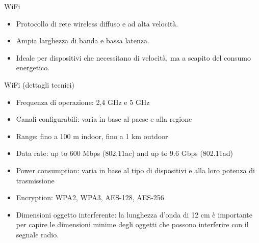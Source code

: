 \documentclass{beamer}
\begin{document}
	\begin{frame}{WiFi}
		\begin{itemize}
			\item Protocollo di rete wireless diffuso e ad alta velocità.
			\item Ampia larghezza di banda e bassa latenza.
			\item Ideale per dispositivi che necessitano di velocità, ma a scapito del consumo energetico.
		\end{itemize}
	\end{frame}
	\begin{frame}{WiFi (dettagli tecnici)}
		\begin{itemize}
			\item Frequenza di operazione: 2,4 GHz e 5 GHz
			\item Canali configurabili: varia in base al paese e alla regione
			\item Range: fino a 100 m indoor, fino a 1 km outdoor
			\item Data rate: up to 600 Mbps (802.11ac) and up to 9.6 Gbps (802.11ad)
			\item Power consumption: varia in base al tipo di dispositivi e alla loro potenza di trasmissione
			\item Encryption: WPA2, WPA3, AES-128, AES-256
			\item Dimensioni oggetto interferente: la lunghezza d'onda di 12 cm è importante per capire le dimensioni minime degli oggetti che possono interferire con il segnale radio.
		\end{itemize}
	\end{frame}
	
\end{document}
